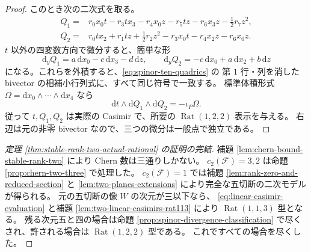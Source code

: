 \begin{proof}
このとき次の二次式を取る。
\begin{align}
 Q_1={}&r_0x_0t-r_3tx_3-r_4x_0z-r_5tz-r_6x_3z-\tfrac12r_7z^2,
 \label{eq:isotropic-Q1}\\
 Q_2={}&r_0tx_2+r_1tz+\tfrac12r_2z^2-r_3x_0t-r_4x_2z-r_6x_0z.
 \label{eq:isotropic-Q2}
\end{align}
$t$ 以外の四変数方向で微分すると、簡単な形
\[
 \mathrm{d}_yQ_1=a\,\mathrm{d} x_0-c\,\mathrm{d} x_3-d\,\mathrm{d} z,
 \qquad
 \mathrm{d}_yQ_2=-c\,\mathrm{d} x_0+a\,\mathrm{d} x_2+b\,\mathrm{d} z
\]
になる。これらを外積すると、\eqref{eq:spinor-ten-quadrics} の
第 $1$ 行・列を消した bivector の相補小行列式に、すべて同じ符号で一致する。
標準体積形式 $\Omega=\mathrm{d} x_0\wedge\cdots\wedge\mathrm{d} x_4$ なら
\begin{equation}
 \mathrm{d} t\wedge\mathrm{d} Q_1\wedge\mathrm{d} Q_2=-\iota_P\Omega.
 \label{eq:universal-isotropic-jacobian-identity}
\end{equation}
従って $t,Q_1,Q_2$ は実際の Casimir で、所要の
$\operatorname{Rat}(1,2,2)$ 表示を与える。
右辺は元の非零 bivector なので、三つの微分は一般点で独立である。
\end{proof}

\begin{proof}[定理 \ref{thm:stable-rank-two-actual-rational} の証明の完結]
補題 \ref{lem:chern-bound-stable-rank-two} により Chern 数は三通りしかない。
$c_2(\mathcal F)=3,2$ は命題 \ref{prop:chern-two-three} で処理した。
$c_2(\mathcal F)=1$ では補題 \ref{lem:rank-zero-and-reduced-section} と
\ref{lem:two-planes-extensions} により完全な五切断の二次モデルが得られる。
元の五切断の像 $W$ の次元が三以下なら、
\eqref{eq:linear-casimir-evaluation} と補題
\ref{lem:two-linear-casimirs-rat113} により
$\operatorname{Rat}(1,1,3)$ 型となる。
残る次元五と四の場合は命題 \ref{prop:spinor-divergence-classification}
で尽くされ、許される場合は $\operatorname{Rat}(1,2,2)$ 型である。
これですべての場合を尽くした。
\end{proof}

